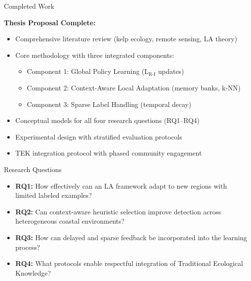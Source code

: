 \documentclass[10pt,xcolor={table,dvipsnames},t]{beamer}
\begin{document}
\begin{frame}{Completed Work}

\textbf{Thesis Proposal Complete:}
\begin{itemize}
  \item Comprehensive literature review (kelp ecology, remote sensing, LA theory)
  \item Core methodology with three integrated components:
  \begin{itemize}
    \item Component 1: Global Policy Learning (L$_{\text{R-I}}$ updates)
    \item Component 2: Context-Aware Local Adaptation (memory banks, k-NN)
    \item Component 3: Sparse Label Handling (temporal decay)
  \end{itemize}
  \item Conceptual models for all four research questions (RQ1--RQ4)
  \item Experimental design with stratified evaluation protocols
  \item TEK integration protocol with phased community engagement
\end{itemize}

\end{frame}

\begin{frame}{Research Questions}

\begin{itemize}
  \item \textbf{RQ1:} How effectively can an LA framework adapt to new regions with limited labeled examples?

  \vspace{0.5em}
  \item \textbf{RQ2:} Can context-aware heuristic selection improve detection across heterogeneous coastal environments?

  \vspace{0.5em}
  \item \textbf{RQ3:} How can delayed and sparse feedback be incorporated into the learning process?

  \vspace{0.5em}
  \item \textbf{RQ4:} What protocols enable respectful integration of Traditional Ecological Knowledge?
\end{itemize}

\end{frame}
\end{document}
